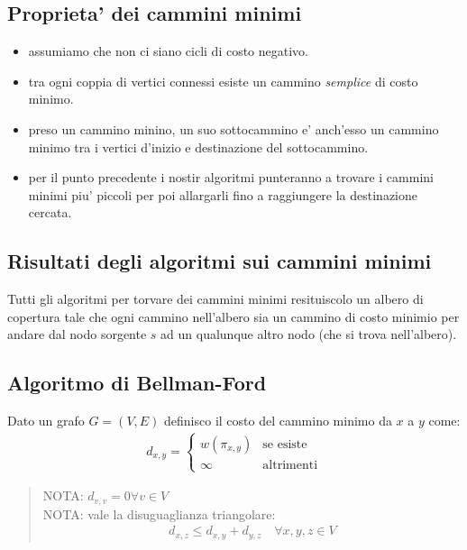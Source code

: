 \documentclass{article}
\begin{document}
\subsection{Proprieta' dei cammini minimi}
\begin{itemize}
  \item assumiamo che non ci siano cicli di costo negativo.
  \item tra ogni coppia di vertici connessi esiste un cammino \emph{semplice} di costo minimo.
  \item preso un cammino minino, un suo sottocammino e' anch'esso un cammino
    minimo tra i vertici d'inizio e destinazione del sottocammino.
  \item per il punto precedente i nostir algoritmi punteranno a trovare i cammini
    minimi piu' piccoli per poi allargarli fino a raggiungere la destinazione cercata.
\end{itemize}

\subsection{Risultati degli algoritmi sui cammini minimi}

Tutti gli algoritmi per torvare dei cammini minimi resituiscolo un albero di
copertura tale che ogni cammino nell'albero sia un cammino di costo minimio
per andare dal nodo sorgente $s$ ad un qualunque altro nodo (che si trova nell'albero).

\subsection{Algoritmo di Bellman-Ford}

Dato un grafo $G = (V, E)$ definisco il costo del cammino minimo da $x$ a $y$ come:
\begin{align*}
  d_{x,y} = \begin{cases}
    w(\pi_{x,y}) &\text{se esiste} \\
    \infty &\text{altrimenti}
  \end{cases}
\end{align*}

\begin{quote}
  NOTA: $d_{v,v} = 0 \forall v \in V$ \\
  NOTA: vale la disuguaglianza triangolare:
  \begin{align*}
    d_{x,z} \leq d_{x,y} + d_{y,z} \quad \forall x, y, z \in V
  \end{align*}
\end{quote}
\end{document}
